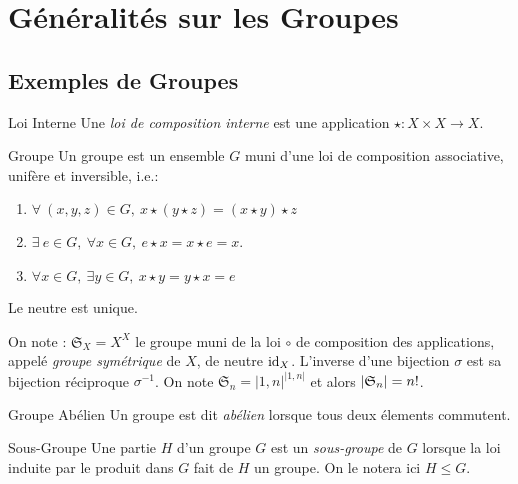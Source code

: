 \documentclass{cours}
\begin{document}
\newpage
\section{Généralités sur les Groupes}
\subsection{Exemples de Groupes}
\begin{définition}{Loi Interne}{}
    Une \emph{loi de composition interne} est une application $\star : X \times X \rightarrow X$.
\end{définition}
\begin{définition}{Groupe}{}
    Un groupe est un ensemble $G$ muni d'une loi de composition associative, unifère et inversible, i.e.:
    \begin{enumerate}
        \item $\forall \ (x, y, z) \in G, \ x \star (y \star z) = (x \star y) \star z$
        \item $\exists \ e \in G,\ \forall x \in G, \ e\star x = x \star e = x$.
        \item $\forall x \in G, \ \exists y \in G, \ x \star y = y \star x = e$
    \end{enumerate}
\end{définition}

\begin{remark}
    Le neutre est unique.
\end{remark}

\begin{example}
    On note : $\mathfrak{S}_{X} = X^{X}$ le groupe muni de la loi $\circ$ de composition des applications, appelé \emph{groupe symétrique} de $X$, de neutre $\textmd{id}_{X}$. L'inverse d'une bijection $\sigma$ est sa bijection réciproque $\sigma^{-1}$. On note $\mathfrak{S}_{n} = \lvert 1, n\rvert^{\lvert 1, n\rvert}$ et alors $\left|\mathfrak{S}_{n}\right| = n!$.
\end{example}

\begin{définition}{Groupe Abélien}{}
    Un groupe est dit \emph{abélien} lorsque tous deux élements commutent.
\end{définition}

\begin{définition}{Sous-Groupe}{}
    Une partie $H$ d'un groupe $G$ est un \emph{sous-groupe} de $G$ lorsque la loi induite par le produit dans $G$ fait de $H$ un groupe. On le notera ici $H \leq G$.
\end{définition}
\end{document}

